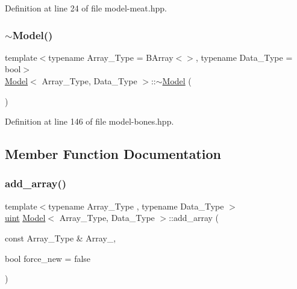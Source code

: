 Definition at line 24 of file model-\/meat.\+hpp.

\mbox{\label{class_model_aaed0a5937479c213e620bf8095ddea5d}} 
\subsubsection{\texorpdfstring{$\sim$\+Model()}{~Model()}}
{\footnotesize\ttfamily template$<$typename Array\+\_\+\+Type  = B\+Array$<$$>$, typename Data\+\_\+\+Type  = bool$>$ \\
\hyperlink{class_model}{Model}$<$ Array\+\_\+\+Type, Data\+\_\+\+Type $>$\+::$\sim$\hyperlink{class_model}{Model} (\begin{DoxyParamCaption}{ }\end{DoxyParamCaption})\hspace{0.3cm}{\ttfamily [inline]}}



Definition at line 146 of file model-\/bones.\+hpp.



\subsection{Member Function Documentation}
\mbox{\label{class_model_a28ad7090cb5b3f3be9e24d9aef15ce75}} 
\subsubsection{\texorpdfstring{add\+\_\+array()}{add\_array()}}
{\footnotesize\ttfamily template$<$typename Array\+\_\+\+Type , typename Data\+\_\+\+Type $>$ \\
\hyperlink{typedefs_8hpp_a91ad9478d81a7aaf2593e8d9c3d06a14}{uint} \hyperlink{class_model}{Model}$<$ Array\+\_\+\+Type, Data\+\_\+\+Type $>$\+::add\+\_\+array (\begin{DoxyParamCaption}\item[{const Array\+\_\+\+Type \&}]{Array\+\_\+,  }\item[{bool}]{force\+\_\+new = {\ttfamily false} }\end{DoxyParamCaption})\hspace{0.3cm}{\ttfamily [inline]}}



